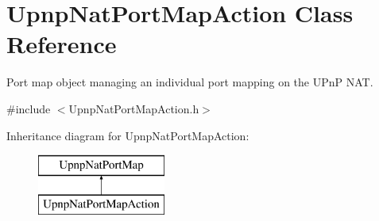 \hypertarget{class_upnp_nat_port_map_action}{
\section{UpnpNatPortMapAction Class Reference}
\label{class_upnp_nat_port_map_action}
}


Port map object managing an individual port mapping on the UPnP NAT.  




{\ttfamily \#include $<$UpnpNatPortMapAction.h$>$}

Inheritance diagram for UpnpNatPortMapAction:\begin{figure}[H]
\begin{center}
\leavevmode
\includegraphics[height=2.000000cm]{class_upnp_nat_port_map_action}
\end{center}
\end{figure}
